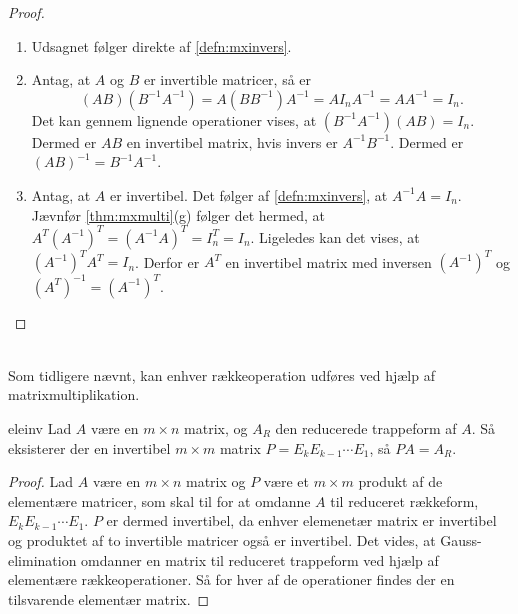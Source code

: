 %
%
\begin{proof}
\begin{enumerate}[label=(\alph*)]
\item Udsagnet følger direkte af \ref{defn:mxinvers}. 
%
\item Antag, at $A$ og $B$ er invertible matricer, så er
$$(AB)(B^{-1}A^{-1})=A(BB^{-1})A^{-1}=AI_nA^{-1}=AA^{-1}=I_n.$$ 
Det kan gennem lignende operationer vises, at $(B^{-1}A^{-1})(AB)=I_n$.
Dermed er $AB$ en invertibel matrix, hvis invers er $A^{-1}B^{-1}$.
Dermed er $(AB)^{-1}=B^{-1}A^{-1}$.
%
\item Antag, at $A$ er invertibel. 
Det følger af \ref{defn:mxinvers}, at $A^{-1}A=I_n$. 
Jævnfør \ref{thm:mxmulti}(g) følger det hermed, at $A^T(A^{-1})^T=(A^{-1}A)^T=I_n^T=I_n$. 
Ligeledes kan det vises, at $(A^{-1})^TA^T=I_n$. 
Derfor er $A^T$ en invertibel matrix med inversen $(A^{-1})^T$ og $(A^T)^{-1}=(A^{-1})^T$.
\end{enumerate}
\end{proof}\\
%
%
Som tidligere nævnt, kan enhver rækkeoperation udføres ved hjælp af matrixmultiplikation.
%
\begin{thm}{}{eleinv}
Lad $A$ være en $m \times n$ matrix, og $A_R$ den reducerede trappeform af $A$. 
Så eksisterer der en invertibel $m \times m$ matrix $P=E_kE_{k-1} \cdots E_1$, så $PA=A_R$.
\end{thm}
\begin{proof}
Lad $A$ være en $m \times n$ matrix og $P$ være et $m \times m$ produkt af de elementære matricer, som skal til for at omdanne $A$ til reduceret rækkeform, $E_kE_{k-1} \cdots E_1$. 
$P$ er dermed invertibel, da enhver elemenetær matrix er invertibel og produktet af to invertible matricer også er invertibel. 
Det vides, at Gauss-elimination omdanner en matrix til reduceret trappeform ved hjælp af elementære rækkeoperationer.
Så for hver af de operationer findes der en tilsvarende elementær matrix.
%
\end{proof}
